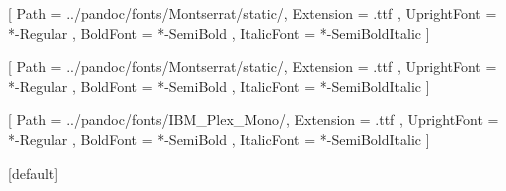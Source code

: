 


\makeatother
\usepackage{fontspec}


\usepackage{graphicx}
\usepackage{adjustbox}

\setmainfont{Montserrat}[
Path = ../pandoc/fonts/Montserrat/static/,
Extension = .ttf ,
UprightFont = *-Regular ,
BoldFont = *-SemiBold ,
ItalicFont = *-SemiBoldItalic
]

\setsansfont{Montserrat}[
Path = ../pandoc/fonts/Montserrat/static/,
Extension = .ttf ,
UprightFont = *-Regular ,
BoldFont = *-SemiBold ,
ItalicFont = *-SemiBoldItalic
]


\setmonofont{IBMPlexMono}[
Path = ../pandoc/fonts/IBM_Plex_Mono/,
Extension = .ttf ,
UprightFont = *-Regular ,
BoldFont = *-SemiBold ,
ItalicFont = *-SemiBoldItalic
]



\usepackage{array}
\usepackage{easybmat}
\usepackage{tikz}

\usetikzlibrary{positioning}
\usetikzlibrary{matrix,calc,tikzmark,arrows,shapes,backgrounds}
\usetikzlibrary{fit, arrows.meta, shapes}        


\usepackage{tabularx, booktabs}


\usepackage{xcolor,colortbl, transparent}
\newcommand{\col}{\cellcolor{col!30}} 


[default]


